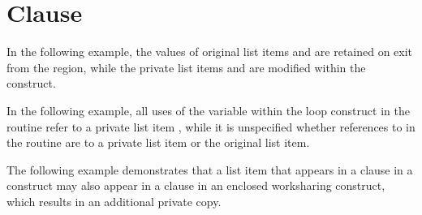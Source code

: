 \section{ Clause}
\label{sec:private}

In the following example, the values of original list items  and  
are retained on exit from the  region, while the private list 
items  and  are modified within the  construct. 



\pagebreak
In the following example, all uses of the variable  within the loop construct 
in the routine  refer to a private list item , while it is 
unspecified whether references to  in the routine  are to a 
private list item or the original list item.



The following example demonstrates that a list item that appears in a  
 clause in a  construct may also appear in a  
 clause in an enclosed worksharing construct, which results in an additional private 
copy.




